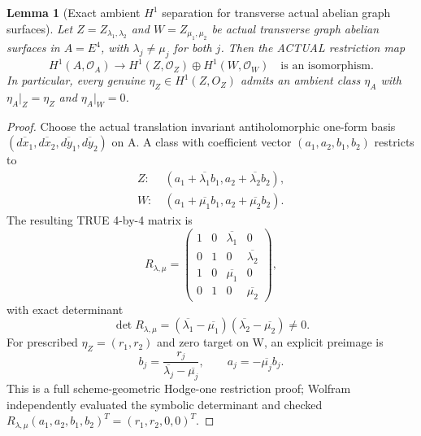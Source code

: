 \documentclass[11pt,a4paper]{article}
\newtheorem{lemma}[theorem]{Lemma}
\begin{document}
\begin{lemma}[Exact ambient \(H^1\) separation for transverse actual abelian graph surfaces]
Let
\(Z=Z_{\lambda_1,\lambda_2}\)
and
\(W=Z_{\mu_1,\mu_2}\)
be actual
transverse graph
abelian surfaces
in \(A=E^4\),
with
\(\lambda_j\ne\mu_j\)
for both \(j\).
Then the ACTUAL
restriction map
\[
 \boxed{
 H^1(A,\mathcal O_A)
  \longrightarrow
 H^1(Z,\mathcal O_Z)
    \oplus H^1(W,\mathcal O_W)
 \quad\text{is an isomorphism.}
 }                                                       \tag{10.1}
\]
In particular,
every genuine
\(\eta_Z\in H^1(Z,O_Z)\)
admits an ambient
class \(\eta_A\)
with
\(
\eta_A|_Z=\eta_Z
\)
and
\(
\eta_A|_W=0
\).
\end{lemma}
\begin{proof}
Choose the
actual translation
invariant
antiholomorphic
one-form basis
\(
(\overline{dx_1},
 \overline{dx_2},
 \overline{dy_1},
 \overline{dy_2})
\)
on A.
A class
with coefficient
vector \((a_1,a_2,b_1,b_2)\)
restricts to
\[
 \begin{aligned}
 Z:&\
 (a_1+\overline{\lambda_1}b_1,
  a_2+\overline{\lambda_2}b_2),\\
 W:&\
 (a_1+\overline{\mu_1}b_1,
  a_2+\overline{\mu_2}b_2).
 \end{aligned}
\]
The resulting
TRUE 4-by-4 matrix is
\[
 R_{\lambda,\mu}
 =\begin{pmatrix}
 1&0&\overline{\lambda_1}&0\\
 0&1&0&\overline{\lambda_2}\\
 1&0&\overline{\mu_1}&0\\
 0&1&0&\overline{\mu_2}
 \end{pmatrix},
\]
with exact determinant
\[
 \boxed{
 \det R_{\lambda,\mu}
 =(\overline{\lambda_1}-\overline{\mu_1})
  (\overline{\lambda_2}-\overline{\mu_2})
 \ne0.}                                                 \tag{10.2}
\]
For prescribed
\(\eta_Z=(r_1,r_2)\)
and zero target
on W, an explicit
preimage is
\[
 b_j=\frac{r_j}
           {\overline{\lambda_j}-
              \overline{\mu_j}},
 \qquad a_j=-\overline{\mu_j}b_j.
                                                               \tag{10.3}
\]
This is a full
scheme-geometric
Hodge-one restriction
proof; Wolfram
independently
evaluated the
symbolic determinant
and checked
\(R_{\lambda,\mu}
(a_1,a_2,b_1,b_2)^T
=(r_1,r_2,0,0)^T\).
\end{proof}
\end{document}
